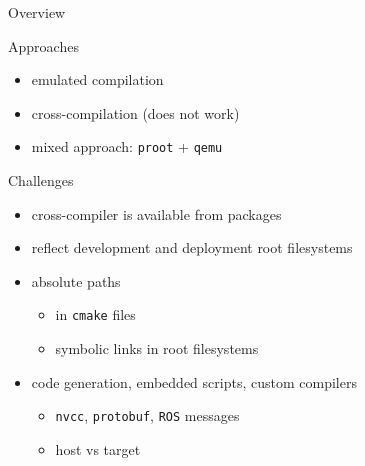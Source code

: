 \documentclass[hyperref={colorlinks=false, breaklinks=true},11pt]{beamer}
\begin{document}
\begin{frame}{Overview}
    \begin{block}{Approaches}
        \begin{itemize}
            \item emulated compilation
            \item cross-compilation (does not work)
            \item mixed approach: \texttt{proot} + \texttt{qemu}
        \end{itemize}
    \end{block}

    \begin{block}{Challenges}
        \begin{itemize}
            \item cross-compiler is available from packages
            \item reflect development and deployment root filesystems
            \item absolute paths
                \begin{itemize}
                    \item in \texttt{cmake} files
                    \item symbolic links in root filesystems
                \end{itemize}
            \item code generation, embedded scripts, custom compilers
                \begin{itemize}
                    \item \texttt{nvcc}, \texttt{protobuf}, \texttt{ROS} messages
                    \item host vs target
                \end{itemize}
        \end{itemize}
    \end{block}
\end{frame}
\end{document}
